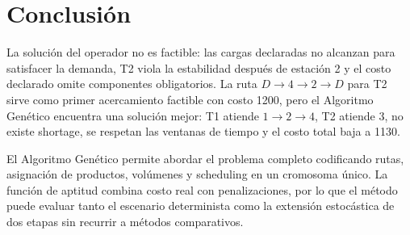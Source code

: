 \documentclass[11pt,letterpaper]{article}
\begin{document}
\section*{Conclusión}

La solución del operador no es factible: las cargas declaradas no alcanzan para satisfacer la
demanda, T2 viola la estabilidad después de estación 2 y el costo declarado omite componentes
obligatorios. La ruta \(D\to4\to2\to D\) para T2 sirve como primer acercamiento factible
con costo 1200, pero el Algoritmo Genético encuentra una solución mejor: T1 atiende
\(1\to2\to4\), T2 atiende \(3\), no existe shortage, se respetan las ventanas de tiempo y
el costo total baja a 1130.

El Algoritmo Genético permite abordar el problema completo codificando rutas, asignación de
productos, volúmenes y scheduling en un cromosoma único. La función de aptitud combina costo
real con penalizaciones, por lo que el método puede evaluar tanto el escenario determinista como
la extensión estocástica de dos etapas sin recurrir a métodos comparativos.
\end{document}
